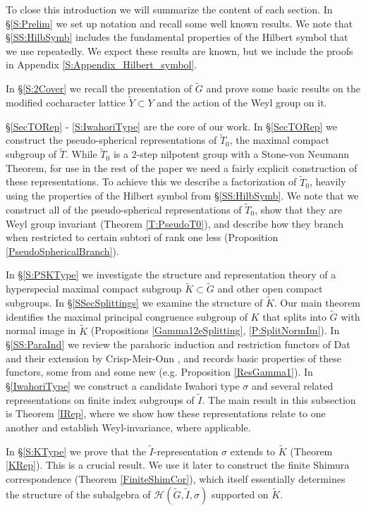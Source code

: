 \documentclass[10pt, letterpaper]{amsart}
\theoremstyle{plain}
\theoremstyle{definition}
\numberwithin{equation}{section}
\newcommand{\Gt}{\widetilde{G}}
\newcommand{\It}{\widetilde{I}}
\newcommand{\Kt}{\widetilde{K}}
\newcommand{\Tt}{\widetilde{T}}
\newcommand{\Yt}{\widetilde{Y}}
\newcommand{\Hcal}{\mathcal{H}}
\begin{document}
\quad


To close this introduction we will summarize the content of each section. In \S \ref{S:Prelim} we set up notation and recall some well known results. We note that \S \ref{SS:HilbSymb} includes the fundamental properties of the Hilbert symbol that we use repeatedly. We expect these results are known, but we include the proofs in Appendix \ref{S:Appendix_Hilbert_symbol}.

In \S \ref{S:2Cover} we recall the presentation of $\Gt$ and prove some basic results on the modified cocharacter lattice $\Yt\subset Y$ and the action of the Weyl group on it.

\S \ref{SecTORep} - \ref{S:IwahoriType} are the core of our work. In \S \ref{SecTORep} we construct the pseudo-spherical representations of $\Tt_{0}$, the maximal compact subgroup of $\Tt$. While $\Tt_{0}$ is a $2$-step nilpotent group with a Stone-von Neumann Theorem, for use in the rest of the paper we need a fairly explicit construction of these representations. To achieve this we describe a factorization of $\Tt_{0}$, heavily using the properties of the Hilbert symbol from \S \ref{SS:HilbSymb}. We note that we construct all of the pseudo-spherical representations of $\Tt_{0}$, show that they are Weyl group invariant (Theorem \ref{T:PseudoT0}), and describe how they branch when restricted to certain subtori of rank one less (Proposition \ref{PseudoSphericalBranch}).

In \S \ref{S:PSKType} we investigate the structure and representation theory of a hyperspecial maximal compact subgroup $\Kt\subset\Gt$ and other open compact subgroups. In \S \ref{SSecSplittings} we examine the structure of $\Kt$. Our main theorem identifies the maximal principal congruence subgroup of $K$ that splits into $\Gt$ with normal image in $\Kt$ (Propositions \ref{Gamma12eSplitting}, \ref{P:SplitNormIm}). In \S \ref{SS:ParaInd} we review the parahoric induction and restriction functors of Dat \cite{D09} and their extension by Crisp-Meir-Onn \cite{CMO19}, and records basic properties of these functors, some from \cite{D09,CMO19} and some new (e.g. Proposition \ref{ResGamma1}). In \S \ref{IwahoriType} we construct a candidate Iwahori type $\sigma$ and several related representations on finite index subgroups of $\It$. The main result in this subsection is Theorem \ref{IRep}, where we show how these representations relate to one another and establish Weyl-invariance, where applicable.

In \S \ref{S:KType} we prove that the $\It$-representation $\sigma$ extends to $\Kt$ (Theorem \ref{KRep}). This is a crucial result. We use it later to construct the finite Shimura correspondence (Theorem \ref{FiniteShimCor}), which itself essentially determines the structure of the subalgebra of $\Hcal(\Gt,\It,\sigma)$ supported on $\Kt$.
\end{document}

